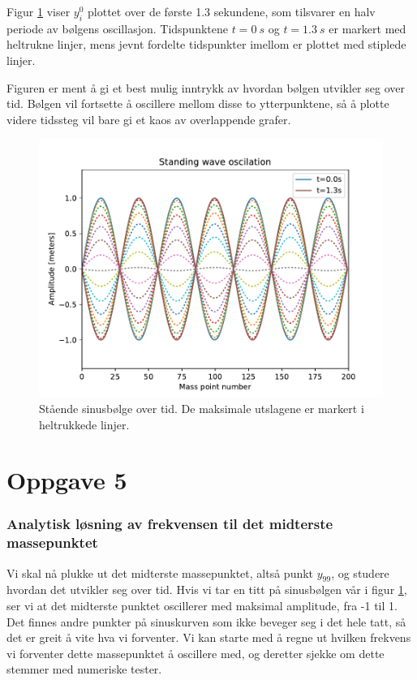 \documentclass[12p,a4paper]{report}
\begin{document}
Figur \ref{fig:sinus_wave} viser $y_i^0$ plottet over de første 1.3 sekundene, som tilsvarer en halv periode av bølgens oscillasjon. Tidspunktene $t=\SI{0}{s}$ og $t=\SI{1.3}{s}$ er markert med heltrukne linjer, mens jevnt fordelte tidspunkter imellom er plottet med stiplede linjer.

Figuren er ment å gi et best mulig inntrykk av hvordan bølgen utvikler seg over tid. Bølgen vil fortsette å oscillere mellom disse to ytterpunktene, så å plotte videre tidssteg vil bare gi et kaos av overlappende grafer.

\begin{figure}[H]
\centering
\includegraphics[width = \textwidth]{../fig/sinus_wave.pdf}
\caption{Stående sinusbølge over tid. De maksimale utslagene er markert i heltrukkede linjer.}
\label{fig:sinus_wave}
\end{figure}



\section*{Oppgave 5}
\subsubsection*{Analytisk løsning av frekvensen til det midterste massepunktet}
Vi skal nå plukke ut det midterste massepunktet, altså punkt $y_{99}$, og studere hvordan det utvikler seg over tid. Hvis vi tar en titt på sinusbølgen vår i figur \ref{fig:sinus_wave}, ser vi at det midterste punktet oscillerer med maksimal amplitude, fra -1 til 1. Det finnes andre punkter på sinuskurven som ikke beveger seg i det hele tatt, så det er greit å vite hva vi forventer. Vi kan starte med å regne ut hvilken frekvens vi forventer dette massepunktet å oscillere med, og deretter sjekke om dette stemmer med numeriske tester.
\end{document}
